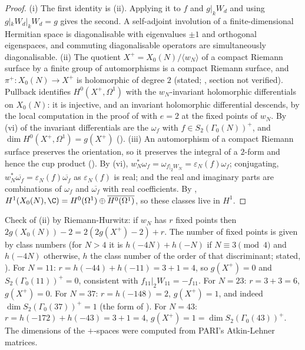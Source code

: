 \begin{proof}
(i) The first identity is (ii). Applying it to $f$ and $g|_kW_d$ and using $g|_kW_d|_kW_d=g$ gives the second. A self-adjoint involution of a finite-dimensional
Hermitian space is diagonalisable with eigenvalues $\pm1$ and orthogonal eigenspaces, and commuting diagonalisable operators are simultaneously diagonalisable.
(ii) The quotient $X^+=X_0(N)/\langle w_N\rangle$ of a compact Riemann surface by a finite group of automorphisms is a compact Riemann surface, and $\pi^+\colon X_0(N)\to X^+$ is holomorphic of
degree $2$ (stated; \cite[Chapter III, Section 3]{Miranda}, section not verified). Pullback identifies $H^0(X^+,\Omega^1)$ with the $w_N$-invariant holomorphic differentials on $X_0(N)$: it is
injective, and an invariant holomorphic differential descends, by the local computation in the proof of  with $e=2$ at the fixed points
of $w_N$. By (vi) of  the invariant differentials are the $\omega_f$ with $f\in S_2(\Gamma_0(N))^+$, and $\dim H^0(X^+,\Omega^1)=g(X^+)$ ().
(iii) An automorphism of a compact Riemann surface preserves the orientation, so it preserves the integral of a $2$-form and hence the cup product (). By
(vi), $w_N^*\omega_f=\omega_{f|_2W_N}=\varepsilon_N(f)\omega_f$; conjugating, $w_N^*\overline{\omega_f}=\varepsilon_N(f)\overline{\omega_f}$ as $\varepsilon_N(f)$ is real; and the real and imaginary parts are
combinations of $\omega_f$ and $\overline{\omega_f}$ with real coefficients. By , $H^1(X_0(N),\C)=H^0(\Omega^1)\oplus\overline{H^0(\Omega^1)}$, so these classes live in $H^1$.
\end{proof}

Check of (ii) by Riemann-Hurwitz: if $w_N$ has $r$ fixed points then $2g(X_0(N))-2=2(2g(X^+)-2)+r$. The number of fixed points is given by class numbers (for $N>4$ it is
$h(-4N)+h(-N)$ if $N\equiv3\pmod4$ and $h(-4N)$ otherwise, $h$ the class number of the order of that discriminant; stated, \cite{Ogg73}). For $N=11$: $r=h(-44)+h(-11)=3+1=4$, so
$g(X^+)=0$ and $S_2(\Gamma_0(11))^+=0$, consistent with $f_{11}|_2W_{11}=-f_{11}$. For $N=23$: $r=3+3=6$, $g(X^+)=0$. For $N=37$: $r=h(-148)=2$, $g(X^+)=1$, and indeed $\dim S_2(\Gamma_0(37))^+=1$
(the form of ). For $N=43$: $r=h(-172)+h(-43)=3+1=4$, $g(X^+)=1=\dim S_2(\Gamma_0(43))^+$. The dimensions of the $+$-spaces were computed from PARI's Atkin-Lehner matrices.

